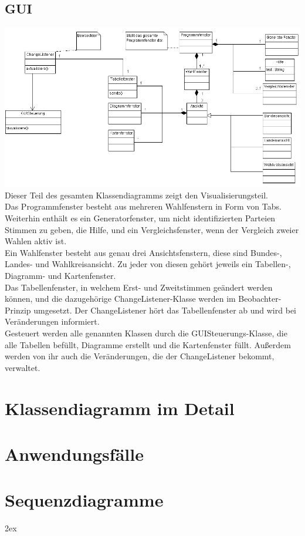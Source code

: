 \documentclass[10pt,a4paper]{article}
\begin{document}
\subsection{GUI}
\includegraphics[scale=0.6]{GUI-Abschnitt.png} \\
Dieser Teil des gesamten Klassendiagramms zeigt den Visualisierungsteil. \\
Das Programmfenster besteht aus mehreren Wahlfenstern in Form von Tabs. Weiterhin enthält es
ein Generatorfenster, um nicht identifizierten Parteien Stimmen zu geben, die Hilfe, und
ein Vergleichsfenster, wenn der Vergleich zweier Wahlen aktiv ist. \\
Ein Wahlfenster besteht aus genau drei Ansichtsfenstern, diese sind Bundes-, Landes- und
Wahlkreisansicht.
Zu jeder von diesen gehört jeweils ein Tabellen-, Diagramm- und Kartenfenster. \\
Das Tabellenfenster, in welchem Erst- und Zweitstimmen geändert werden können, und die
dazugehörige ChangeListener-Klasse werden im Beobachter-Prinzip umgesetzt. Der ChangeListener
hört das Tabellenfenster ab und wird bei Veränderungen informiert. \\
Gesteuert werden alle genannten Klassen durch die GUISteuerungs-Klasse, die alle Tabellen befüllt,
Diagramme erstellt und die Kartenfenster füllt. Außerdem werden von ihr auch die Veränderungen,
die der ChangeListener bekommt, verwaltet.

\section{Klassendiagramm im Detail}




\section{Anwendungsfälle}



\section{Sequenzdiagramme}


\begingroup
\parindent 0pt
\parskip 2ex
\def\enotesize{\normalsize}

\endgroup
\end{document}
